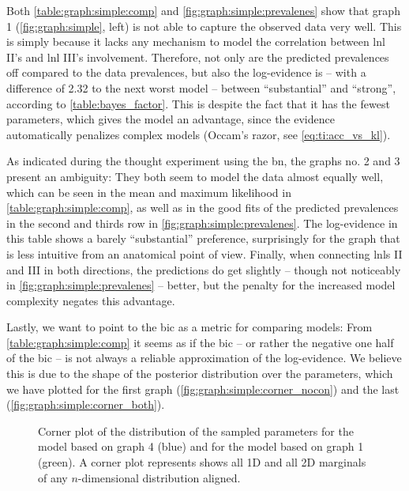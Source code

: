 \documentclass[\relativeRoot/main.tex]{subfiles}
\begin{document}
Both \cref{table:graph:simple:comp} and \cref{fig:graph:simple:prevalenes} show that graph 1 (\cref{fig:graph:simple}, left) is not able to capture the observed data very well. This is simply because it lacks any mechanism to model the correlation between \gls{lnl} II's and \gls{lnl} III's involvement. Therefore, not only are the predicted prevalences off compared to the data prevalences, but also the log-evidence is -- with a difference of 2.32 to the next worst model -- between ``substantial'' and ``strong'', according to \cref{table:bayes_factor}. This is despite the fact that it has the fewest parameters, which gives the model an advantage, since the evidence automatically penalizes complex models (Occam's razor, see \cref{eq:ti:acc_vs_kl}).

As indicated during the thought experiment using the \acrlong{bn}, the graphs no. 2 and 3 present an ambiguity: They both seem to model the data almost equally well, which can be seen in the mean and maximum likelihood in \cref{table:graph:simple:comp}, as well as in the good fits of the predicted prevalences in the second and thirds row in \cref{fig:graph:simple:prevalenes}. The log-evidence in this table shows a barely ``substantial'' preference, surprisingly for the graph that is less intuitive from an anatomical point of view. Finally, when connecting \glspl{lnl} II and III in both directions, the predictions do get slightly -- though not noticeably in \cref{fig:graph:simple:prevalenes} -- better, but the penalty for the increased model complexity negates this advantage.

Lastly, we want to point to the \gls{bic} as a metric for comparing models: From \cref{table:graph:simple:comp} it seems as if the \gls{bic} -- or rather the negative one half of the \gls{bic} -- is not always a reliable approximation of the log-evidence. We believe this is due to the shape of the posterior distribution over the parameters, which we have plotted for the first graph (\cref{fig:graph:simple:corner_nocon}) and the last (\cref{fig:graph:simple:corner_both}).

\begin{figure}
    \centering
    \def\svgwidth{1.0\textwidth}
    
    \caption[
        Corner plots of the graphs no. 1 and no. 4
    ]{
        Corner plot of the distribution of the sampled parameters for the model based on graph 4 (blue) and for the model based on graph 1 (green). A corner plot represents shows all 1D and all 2D marginals of any $n$-dimensional distribution aligned.
    }
    \label{fig:graph:simple:corner}
\end{figure}
\end{document}
